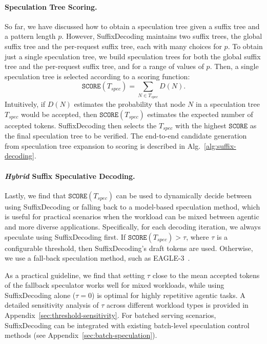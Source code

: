 \paragraph{Speculation Tree Scoring.}

So far, we have discussed how to obtain a speculation tree given a suffix tree and a pattern length \( p \). However, SuffixDecoding maintains two suffix trees, the global suffix tree and the per-request suffix tree, each with many choices for \( p \). To obtain just a single speculation tree, we build speculation trees for both the global suffix tree and the per-request suffix tree, and for a range of values of \( p \). Then, a single speculation tree is selected according to a scoring function:
\[
\texttt{SCORE}(T_{spec}) = \sum_{N \in T_{spec}} D(N).
\]
Intuitively, if \( D(N) \) estimates the probability that node \( N \) in a speculation tree \( T_{spec} \) would be accepted, then \( \texttt{SCORE}(T_{spec}) \) estimates the expected number of accepted tokens. SuffixDecoding then selects the \( T_{spec} \) with the highest \( \texttt{SCORE} \) as the final speculation tree to be verified.
The end-to-end candidate generation from speculation tree expansion to scoring is described in Alg.~\ref{alg:suffix-decoding}.

\paragraph{\emph{Hybrid} Suffix Speculative Decoding.}

Lastly, we find that \( \texttt{SCORE}(T_{spec}) \) can be used to dynamically decide between using SuffixDecoding or falling back to a model-based speculation method, which is useful for practical scenarios when the workload can be mixed between agentic and more diverse applications. Specifically, for each decoding iteration, we always speculate using SuffixDecoding first. If \( \texttt{SCORE}(T_{spec}) > \tau \), where \( \tau \) is a configurable threshold, then SuffixDecoding's draft tokens are used. Otherwise, we use a fall-back speculation method, such as EAGLE-3~\citep{li2025eagle3scalinginferenceacceleration}. 

As a practical guideline, we find that setting $\tau$ close to the mean accepted tokens of the fallback speculator works well for mixed workloads, while using SuffixDecoding alone ($\tau = 0$) is optimal for highly repetitive agentic tasks. A detailed sensitivity analysis of $\tau$ across different workload types is provided in Appendix~\ref{sec:threshold-sensitivity}. For batched serving scenarios, SuffixDecoding can be integrated with existing batch-level speculation control methods (see Appendix~\ref{sec:batch-speculation}).
